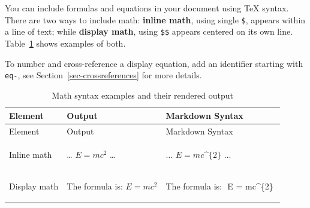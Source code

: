 \documentclass[
  letterpaper,
  DIV=11,
  numbers=noendperiod,
  oneside]{scrreprt}
\newenvironment{Shaded}{\begin{snugshade}}{\end{snugshade}}
\newcommand{\AnnotationTok}[1]{\textcolor[rgb]{0.37,0.37,0.37}{#1}}
\newcommand{\CommentTok}[1]{\textcolor[rgb]{0.37,0.37,0.37}{#1}}
\newcommand{\NormalTok}[1]{\textcolor[rgb]{0.00,0.23,0.31}{#1}}
\begin{document}
\begin{tcolorbox}
You can include formulas and equations in your document using TeX
syntax. There are two ways to include math: \textbf{inline math}, using
single \texttt{\$}, appears within a line of text; while \textbf{display
math}, using \texttt{\$\$} appears centered on its own line.
Table~\ref{tbl-math-examples} shows examples of both.

To number and cross-reference a display equation, add an identifier
starting with \texttt{eq-}, see Section~\ref{sec-crossreferences} for
more details.

\begin{longtable}[]{@{}
  >{\raggedright\arraybackslash}p{}
  >{\raggedright\arraybackslash}p{}
  >{\raggedright\arraybackslash}p{}@{}}
\caption[]{Math syntax examples and their rendered
output}\label{tbl-math-examples}\tabularnewline
\toprule\noalign{}
\begin{minipage}[b]{\linewidth}\raggedright
Element
\end{minipage} & \begin{minipage}[b]{\linewidth}\raggedright
Output
\end{minipage} & \begin{minipage}[b]{\linewidth}\raggedright
Markdown Syntax
\end{minipage} \\
\midrule\noalign{}
\endfirsthead
\toprule\noalign{}
\begin{minipage}[b]{\linewidth}\raggedright
Element
\end{minipage} & \begin{minipage}[b]{\linewidth}\raggedright
Output
\end{minipage} & \begin{minipage}[b]{\linewidth}\raggedright
Markdown Syntax
\end{minipage} \\
\midrule\noalign{}
\endhead
\bottomrule\noalign{}
\endlastfoot
Inline math & \ldots{} \(E = mc^{2}\) \ldots{} &
\begin{minipage}[t]{\linewidth}\raggedright
\begin{Shaded}
\begin{Highlighting}[]
\NormalTok{... $E = mc\^{}\{2\}$ ...}
\end{Highlighting}
\end{Shaded}
\end{minipage} \\
Display math & The formula is: \(
E = mc^{2}
\) & \begin{minipage}[t]{\linewidth}\raggedright
\begin{Shaded}
\begin{Highlighting}[]
\AnnotationTok{The formula is:}\CommentTok{ }
\NormalTok{$$}
\NormalTok{E = mc\^{}\{2\}}
\NormalTok{$$}
\end{Highlighting}
\end{Shaded}
\end{minipage} \\
\end{longtable}


\end{tcolorbox}
\end{document}
